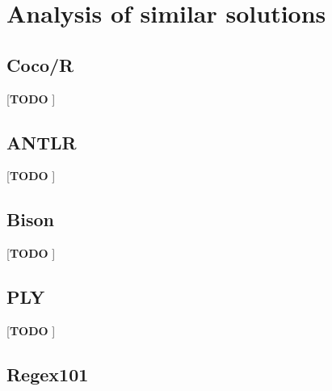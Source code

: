 \documentclass[english,engineering]{wizthesis}
\newcommand{\todo}[1]{{\color{red}[\textbf{TODO} \textit{#1}]}}
\begin{document}



\chapter{Analysis of similar solutions}

\section*{Coco/R}

\todo{\cite{coco/r}}

\section*{ANTLR}

\todo{\cite{antlr}}

\section*{Bison}

\todo{\cite{bison}}

\section*{PLY}

\todo{\cite{ply}}

\section*{Regex101}
\end{document}
